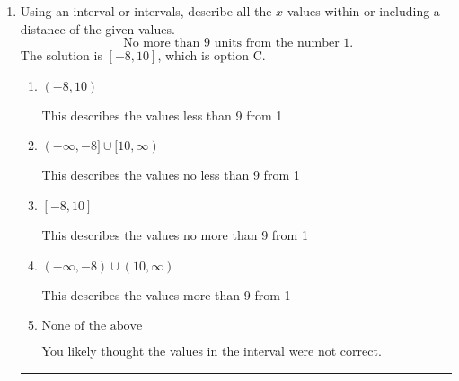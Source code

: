 \documentclass{extbook}[14pt]
\newcommand{\litem}[1]{\item #1

\rule{\textwidth}{0.4pt}}
\begin{document}
\begin{enumerate}
{\begin{enumerate}[label=\Alph*.]
* $[0.071, \infty)$, which is the correct option.
\item \( (-\infty, a], \text{ where } a \in [0.03, 0.15] \)

 $(-\infty, 0.071]$, which corresponds to switching the direction of the interval. You likely did this if you did not flip the inequality when dividing by a negative!
\item \( [a, \infty), \text{ where } a \in [-0.25, -0.02] \)

 $[-0.071, \infty)$, which corresponds to negating the endpoint of the solution.
\item \( (-\infty, a], \text{ where } a \in [-0.18, 0.05] \)

 $(-\infty, -0.071]$, which corresponds to switching the direction of the interval AND negating the endpoint. You likely did this if you did not flip the inequality when dividing by a negative as well as not moving values over to a side properly.
\item \( \text{None of the above}. \)

You may have chosen this if you thought the inequality did not match the ends of the intervals.
\end{enumerate}

\textbf{General Comment:} Remember that less/greater than or equal to includes the endpoint, while less/greater do not. Also, remember that you need to flip the inequality when you multiply or divide by a negative.
}
\litem{
Using an interval or intervals, describe all the $x$-values within or including a distance of the given values.
\[ \text{ No more than } 9 \text{ units from the number } 1. \]The solution is \( [-8, 10] \), which is option C.\begin{enumerate}[label=\Alph*.]
\item \( (-8, 10) \)

This describes the values less than 9 from 1
\item \( (-\infty, -8] \cup [10, \infty) \)

This describes the values no less than 9 from 1
\item \( [-8, 10] \)

This describes the values no more than 9 from 1
\item \( (-\infty, -8) \cup (10, \infty) \)

This describes the values more than 9 from 1
\item \( \text{None of the above} \)

You likely thought the values in the interval were not correct.
\end{enumerate}

}
\end{enumerate}
\end{document}
